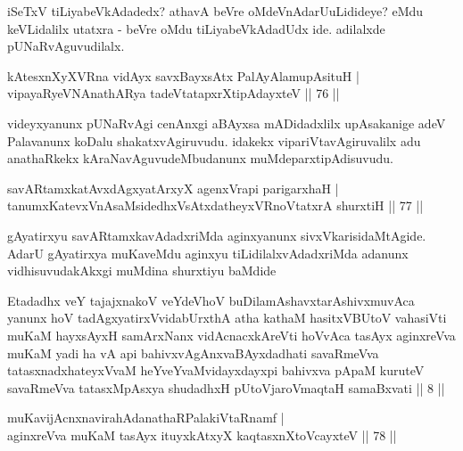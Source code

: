 \begin{artha} 
iSeTxV tiLiyabeVkAdadedx? athavA beVre oMdeVnAdarU\break uLidideye? eMdu 
keVLidalilx utatxra - beVre oMdu tiLiyabeVkAdadUdx ide. adilalxde 
pUNaRvAguvudilalx.
\end{artha}

\begin{shl}
kAtesxnXyXVRna vidAyx savxBayxsAtx PalAyAlamupAsituH | \\
vipayaRyeVNAnathARya tadeVtatapxrXtipAdayxteV \hfill||  76 ||
\end{shl}

\begin{artha} 
videyxyanunx pUNaRvAgi cenAnxgi aBAyxsa mADidadxlilx upAsakanige adeV 
Palavanunx koDalu shakatxvAgiruvudu. idakekx vipariVtavAgiruvalilx adu 
anathaRkekx kAraNavAguvudeMbudanunx muMde\break parxtipAdisuvudu.
\end{artha}

\begin{shl}
savARtamxkatAvxdAgxyatArxyX agenxVrapi parigarxhaH | \\
tanumxKatevxVnAsaMsidedhxVsAtxdatheyxVRnoVtatxrA shurxtiH \hfill||  77 || 
\end{shl}

\begin{artha} 
gAyatirxyu savARtamxkavAdadxriMda aginxyanunx sivxVkarisi\-\break daMtAgide. 
AdarU gAyatirxya muKaveMdu aginxyu tiLidilalxvAdadxriMda adanunx 
vidhisuvudakAkxgi muMdina shurxtiyu baMdide\\
\end{artha}

\begin{kandikeshl}
Etadadhx veY tajajxnakoV veYdeVhoV buDilamAshavxtarAshivxmuvAca yanunx hoV tadAgxyatirxVvidabUrxthA atha kathaM hasitxVBUtoV vahasiVti muKaM hayxsAyxH samArxNanx vidAcnacxkAreVti hoVvAca tasAyx aginxreVva muKaM yadi ha vA api bahivxvAgAnxvaBAyxdadhati savaRmeVva tatasxnadxhateyxVvaM heYveYvaMvidayxdayxpi bahivxva pApaM kuruteV savaRmeVva tatasxMpAsxya shudadhxH pUtoV\s jaroV\s maqtaH samaBxvati || 8 ||
\end{kandikeshl}



\begin{shl}
muKavijAcnxnavirahAdanathaRPalakiVtaRnamf | \\
aginxreVva muKaM tasAyx ituyxkAtxyX kaqtasxnXtoVcayxteV \hfill||  78 || 
\end{shl}

